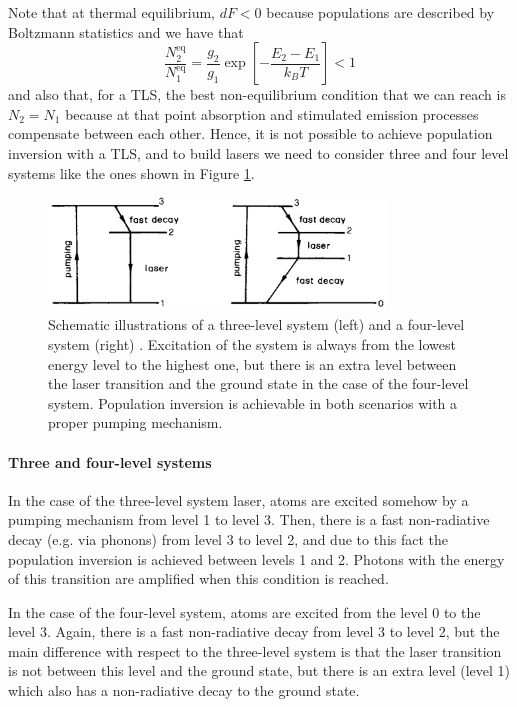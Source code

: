 \documentclass[11pt,a4paper]{article}
\begin{document}
Note that at thermal equilibrium, $dF<0$ because populations are described by Boltzmann statistics and we have that
\begin{equation}
\frac{N_2^\text{eq}}{N_1^\text{eq}}=\frac{g_2}{g_1}\exp\left[-\frac{E_2-E_1}{k_BT}\right]<1
\end{equation}
and also that, for a TLS, the best non-equilibrium condition that we can reach is $N_2=N_1$ because at that point absorption and stimulated emission processes compensate between each other. Hence, it is not possible to achieve population inversion with a TLS, and to build lasers we need to consider three and four level systems like the ones shown in Figure \ref{fig:3LS-4LS}.

\begin{figure}[ht]
\centering
\includegraphics[width=0.8\textwidth]{3LS-4LS}
\caption{Schematic illustrations of a three-level system (left) and a four-level system (right) \cite{svelto2010principles}. Excitation of the system is always from the lowest energy level to the highest one, but there is an extra level between the laser transition and the ground state in the case of the four-level system. Population inversion is achievable in both scenarios with a proper pumping mechanism.}
\label{fig:3LS-4LS}
\end{figure}

\paragraph{Three and four-level systems}
In the case of the three-level system laser, atoms are excited somehow by a pumping mechanism from level 1 to level 3. Then, there is a fast non-radiative decay (e.g. via phonons) from level 3 to level 2, and due to this fact the population inversion is achieved between levels 1 and 2. Photons with the energy of this transition are amplified when this condition is reached.

In the case of the four-level system, atoms are excited from the level 0 to the level 3. Again, there is a fast non-radiative decay from level 3 to level 2, but the main difference with respect to the three-level system is that the laser transition is not between this level and the ground state, but there is an extra level (level 1) which also has a non-radiative decay to the ground state.
\end{document}
